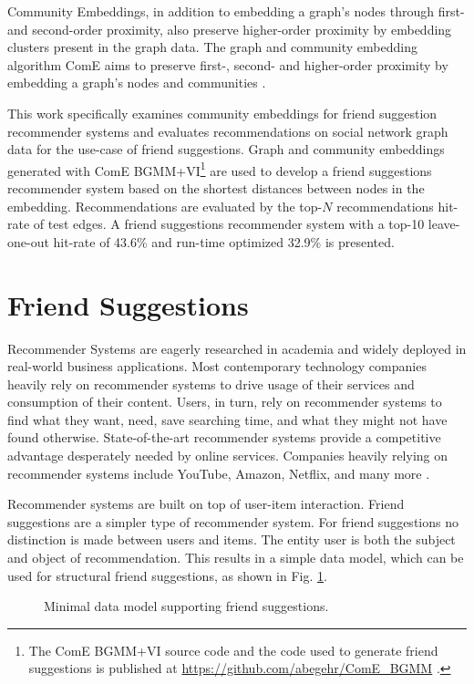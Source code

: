 \documentclass[conference]{IEEEtran}
\begin{document}
Community Embeddings, in addition to embedding a graph's nodes through first- and second-order proximity, also preserve higher-order proximity by embedding clusters present in the graph data. The graph and community embedding algorithm ComE aims to preserve first-, second- and higher-order proximity by embedding a graph's nodes and communities \cite{ComE}.

This work specifically examines community embeddings for friend suggestion recommender systems and evaluates recommendations on social network graph data for the use-case of friend suggestions. Graph and community embeddings generated with ComE BGMM+VI\footnote{The ComE BGMM+VI source code and the code used to generate friend suggestions is published at \url{https://github.com/abegehr/ComE_BGMM} \cite{ComE_BGMM_GH}.} are used to develop a friend suggestions recommender system based on the shortest distances between nodes in the embedding. Recommendations are evaluated by the top-$N$ recommendations hit-rate of test edges. A friend suggestions recommender system with a top-10 leave-one-out hit-rate of 43.6\% and run-time optimized 32.9\% is presented.


\section{Friend Suggestions}

Recommender Systems are eagerly researched in academia and widely deployed in real-world business applications. Most contemporary technology companies heavily rely on recommender systems to drive usage of their services and consumption of their content. Users, in turn, rely on recommender systems to find what they want, need, save searching time, and what they might not have found otherwise. State-of-the-art recommender systems provide a competitive advantage desperately needed by online services. Companies heavily relying on recommender systems include YouTube, Amazon, Netflix, and many more \cite{Rocca19}.

Recommender systems are built on top of user-item interaction. Friend suggestions are a simpler type of recommender system. For friend suggestions no distinction is made between users and items. The entity user is both the subject and object of recommendation. This results in a simple data model, which can be used for structural friend suggestions, as shown in Fig. \ref{fig:data_model}.

\begin{figure}[htbp]
    \centering
    \caption{Minimal data model supporting friend suggestions.}
    \label{fig:data_model}
\end{figure}
\end{document}
